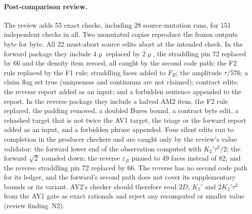 \paragraph{Post-comparison review.}
The review adds 55 exact checks, including 28 source-mutation runs, for 151
independent checks in all. Two unmutated copies reproduce the frozen outputs
byte for byte. All 22 must-abort source edits abort at the intended check. In
the forward package they include $4\varrho$ replaced by $2\varrho$, the
straddling pin 72 replaced by 66 and the density item zeroed, all caught by
the second code path; the F2 rule replaced by the F1 rule; straddling faces
added to $F_R$; the amplitude $\tau/576$; a claim flag set true (uniqueness
and continuum are not claimed); contract edits; the reverse report added as an
input; and a forbidden sentence appended to the report. In the reverse package
they include a halved AM2 item, the F2 rule replaced, the padding removed, a
doubled Bures bound, a contract byte edit, a rehashed target that is not
twice the AV1 target, the triage or the forward report added as an input,
and a forbidden phrase appended. Four silent edits run to completion in the
producer checkers and are caught only by the review's value validator: the
forward lower end of the observation computed with $K_2'\tau^2/2$; the
forward $\sqrt2$ rounded down; the reverse $\varepsilon_R$ pinned to 49
faces instead of 82; and the reverse straddling pin 72 replaced by 66. The
reverse has no second code path for its ledger, and the forward's second
path does not cover its supplementary bounds or its variant. AY2's checker
should therefore read $2D$, $K_2'$ and $2K_2'\tau^2$ from the AY1 gate as
exact rationals and reject any recomputed or smaller value (review
finding~N2).

